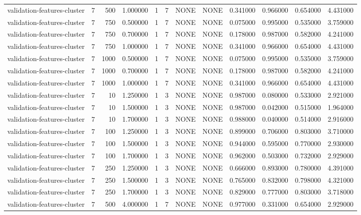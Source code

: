 \begin{tabular}{lrrrllllrrrr}
validation-features-cluster & 7 & 500 & 1.000000 & 1 & 7 & NONE & NONE & 0.341000 & 0.966000 & 0.654000 & 4.431000 \\
validation-features-cluster & 7 & 750 & 0.500000 & 1 & 7 & NONE & NONE & 0.075000 & 0.995000 & 0.535000 & 3.759000 \\
validation-features-cluster & 7 & 750 & 0.700000 & 1 & 7 & NONE & NONE & 0.178000 & 0.987000 & 0.582000 & 4.241000 \\
validation-features-cluster & 7 & 750 & 1.000000 & 1 & 7 & NONE & NONE & 0.341000 & 0.966000 & 0.654000 & 4.431000 \\
validation-features-cluster & 7 & 1000 & 0.500000 & 1 & 7 & NONE & NONE & 0.075000 & 0.995000 & 0.535000 & 3.759000 \\
validation-features-cluster & 7 & 1000 & 0.700000 & 1 & 7 & NONE & NONE & 0.178000 & 0.987000 & 0.582000 & 4.241000 \\
validation-features-cluster & 7 & 1000 & 1.000000 & 1 & 7 & NONE & NONE & 0.341000 & 0.966000 & 0.654000 & 4.431000 \\
validation-features-cluster & 7 & 10 & 1.250000 & 1 & 3 & NONE & NONE & 0.987000 & 0.080000 & 0.533000 & 2.921000 \\
validation-features-cluster & 7 & 10 & 1.500000 & 1 & 3 & NONE & NONE & 0.987000 & 0.042000 & 0.515000 & 1.964000 \\
validation-features-cluster & 7 & 10 & 1.700000 & 1 & 3 & NONE & NONE & 0.988000 & 0.040000 & 0.514000 & 2.916000 \\
validation-features-cluster & 7 & 100 & 1.250000 & 1 & 3 & NONE & NONE & 0.899000 & 0.706000 & 0.803000 & 3.710000 \\
validation-features-cluster & 7 & 100 & 1.500000 & 1 & 3 & NONE & NONE & 0.944000 & 0.595000 & 0.770000 & 2.930000 \\
validation-features-cluster & 7 & 100 & 1.700000 & 1 & 3 & NONE & NONE & 0.962000 & 0.503000 & 0.732000 & 2.929000 \\
validation-features-cluster & 7 & 250 & 1.250000 & 1 & 3 & NONE & NONE & 0.666000 & 0.893000 & 0.780000 & 4.391000 \\
validation-features-cluster & 7 & 250 & 1.500000 & 1 & 3 & NONE & NONE & 0.765000 & 0.832000 & 0.798000 & 4.321000 \\
validation-features-cluster & 7 & 250 & 1.700000 & 1 & 3 & NONE & NONE & 0.829000 & 0.777000 & 0.803000 & 3.718000 \\
validation-features-cluster & 7 & 500 & 4.000000 & 1 & 7 & NONE & NONE & 0.977000 & 0.331000 & 0.654000 & 2.929000 \\

\end{tabular}
